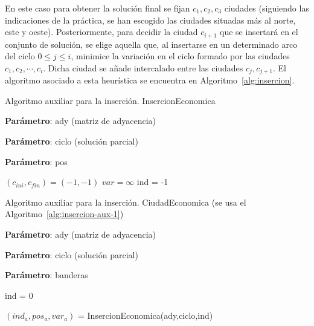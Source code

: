 En este caso para obtener la solución final se fijan $c_1,c_2,c_3$ ciudades
(siguiendo las indicaciones de la práctica, se han
escogido las ciudades situadas más al norte, este y oeste). 
Posteriormente,
para decidir la ciudad $c_{i+1}$ que se insertará en el conjunto de solución,
se elige aquella que, al insertarse en un determinado arco del ciclo 
$0 \leq j \leq i$, minimice la variación en el ciclo formado por las ciudades
$c_1,c_2,\cdots,c_{i}$. Dicha ciudad se añade intercalado entre las ciudades
$c_{j},c_{j+1}$. El algoritmo asociado a esta heurística se encuentra en 
Algoritmo~\ref{alg:insercion}. 

\begin{algorithm}[H]
  \caption{Algoritmo auxiliar para la inserción. InsercionEconomica}\label{alg:insercion-aux-1}
  \begin{minipage}{0.92\textwidth}
    \textbf{Parámetro}: ady (matriz de adyacencia)

    \textbf{Parámetro}: ciclo (solución parcial)

    \textbf{Parámetro}: pos
  \end{minipage}

  $(c_{ini}, c_{fin}) = (-1,-1)$\;
  $var = \infty$\;
  ind = -1\;

  
\end{algorithm}

\begin{algorithm}[H]
  \caption{Algoritmo auxiliar para la inserción. CiudadEconomica (se usa el Algoritmo~\ref{alg:insercion-aux-1})}\label{alg:insercion-aux-2}
  \begin{minipage}{0.92\textwidth}
    \textbf{Parámetro}: ady (matriz de adyacencia)

    \textbf{Parámetro}: ciclo (solución parcial)

    \textbf{Parámetro}: banderas
  \end{minipage}

  ind = 0\;


  $(ind_a, pos_a, var_a)$ = InsercionEconomica(ady,ciclo,ind)\;


  
\end{algorithm}

